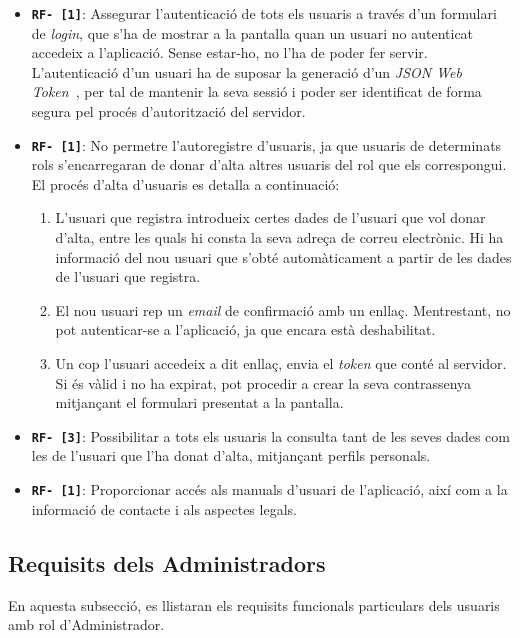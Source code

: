 \documentclass[a4paper,12pt]{ThesisStyle}
\begin{document}
\begin{itemize}
  \item \texttt{\textbf{RF- [1]}}: Assegurar l'autenticació de tots els usuaris a través d'un formulari de \emph{login}, que s'ha de mostrar a la pantalla quan un usuari no autenticat accedeix a l'aplicació. Sense estar-ho, no l'ha de poder fer servir. L'autenticació d'un usuari ha de suposar la generació d'un \textit{JSON Web Token}~\cite{JWT}, per tal de mantenir la seva sessió i poder ser identificat de forma segura pel procés d'autorització del servidor.
  \item \texttt{\textbf{RF- [1]}}: No permetre l'autoregistre d'usuaris, ja que usuaris de determinats rols s'encarregaran de donar d'alta altres usuaris del rol que els correspongui. El procés d'alta d'usuaris es detalla a continuació:
    \begin{enumerate}
      \item L'usuari que registra introdueix certes dades de l'usuari que vol donar d'alta, entre les quals hi consta la seva adreça de correu electrònic. Hi ha informació del nou usuari que s'obté automàticament a partir de les dades de l'usuari que registra.
      \item El nou usuari rep un \textit{email} de confirmació amb un enllaç. Mentrestant, no pot autenticar-se a l'aplicació, ja que encara està deshabilitat.
      \item Un cop l'usuari accedeix a dit enllaç, envia el \textit{token} que conté al servidor. Si és vàlid i no ha expirat, pot procedir a crear la seva contrassenya mitjançant el formulari presentat a la pantalla.
    \end{enumerate}
  \item \texttt{\textbf{RF- [3]}}: Possibilitar a tots els usuaris la consulta tant de les seves dades com les de l'usuari que l'ha donat d'alta, mitjançant perfils personals.
  \item \texttt{\textbf{RF- [1]}}: Proporcionar accés als manuals d'usuari de l'aplicació, així com a la informació de contacte i als aspectes legals.
\end{itemize}

\subsection{Requisits dels Administradors}
\label{subsec:requisits_administradors}

En aquesta subsecció, es llistaran els requisits funcionals particulars dels usuaris amb rol d'Administrador.
\end{document}
